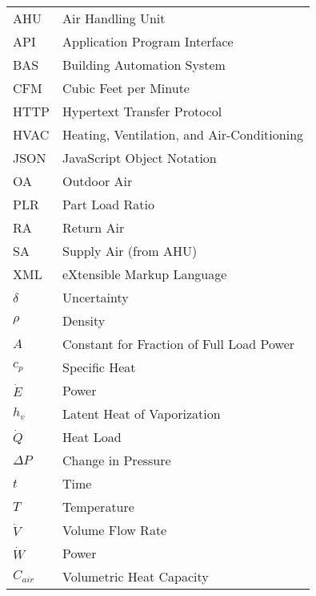 \begin{tabular}{ll}
AHU          & Air Handling Unit\tabularnewline
API          & Application Program Interface                             \\
BAS          & Building Automation System\tabularnewline
CFM          & Cubic Feet per Minute                                     \\
HTTP         & Hypertext Transfer Protocol                               \\
HVAC         & Heating, Ventilation, and Air-Conditioning\tabularnewline
JSON         & JavaScript Object Notation                                \\
OA           & Outdoor Air                                               \\
PLR          & Part Load Ratio                                           \\
RA           & Return Air                                                \\
SA           & Supply Air (from AHU)                                     \\
XML          & eXtensible Markup Language                                \\
\(\delta\)   & Uncertainty                                               \\
\(\rho\)     & Density                                                   \\
\(A\)        & Constant for Fraction of Full Load Power                  \\
\(c_{p}\)    & Specific Heat                                             \\
\(\dot{E}\)  & Power                                                     \\
\(h_{v}\)    & Latent Heat of Vaporization                               \\
\( \dot{Q}\) & Heat Load                                                 \\
\(\Delta P\) & Change in Pressure                                        \\
\(t\)        & Time\tabularnewline
\(T\)        & Temperature\tabularnewline
\(\dot{V}\)  & Volume Flow Rate \tabularnewline
\(\dot{W}\)  & Power                                                     \\
\(C_{air}\)  & Volumetric Heat Capacity \tabularnewline
\end{tabular}


